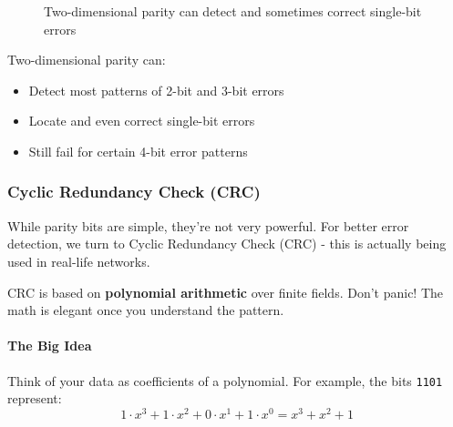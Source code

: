 \begin{figure}[h]
    \centering
    \caption{Two-dimensional parity can detect and sometimes correct single-bit errors}
    \label{fig:2d_parity}
\end{figure}

Two-dimensional parity can:
\begin{itemize}
    \item Detect most patterns of 2-bit and 3-bit errors
    \item Locate and even correct single-bit errors
    \item Still fail for certain 4-bit error patterns
\end{itemize}

\subsubsection{Cyclic Redundancy Check (CRC)}
While parity bits are simple, they're not very powerful. For better error detection, we turn to Cyclic Redundancy Check (CRC) - this is actually being used in real-life networks.

CRC is based on \textbf{polynomial arithmetic} over finite fields. Don't panic! The math is elegant once you understand the pattern.

\paragraph{The Big Idea}
Think of your data as coefficients of a polynomial. For example, the bits \texttt{1101} represent:
\[
1 \cdot x^3 + 1 \cdot x^2 + 0 \cdot x^1 + 1 \cdot x^0 = x^3 + x^2 + 1
\]

